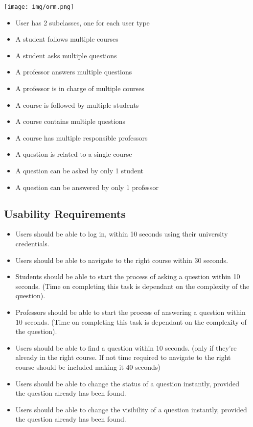 \documentclass[10pt]{report}
\begin{document}
\begin{center}
	\texttt{[image: img/orm.png]}
\end{center}

\begin{itemize}
\item User has 2 subclasses, one for each user type
\item A student follows multiple courses
\item A student asks multiple questions
\item A professor answers multiple questions
\item A professor is in charge of multiple courses
\item A course is followed by multiple students
\item A course contains multiple questions
\item A course has multiple responsible professors
\item A question is related to a single course
\item A question can be asked by only 1 student
\item A question can be answered by only 1 professor

\end{itemize}

\subsection{Usability Requirements}
\begin{itemize}
	\item Users should be able to log in, within 10 seconds using their university credentials.
	\item Users should be able to navigate to the right course within 30 seconds.
	\item Students should be able to start the process of asking a question within 10 seconds. (Time on completing this task is dependant on the complexity of the question).
	\item Professors should be able to start the process of answering a question within 10 seconds. (Time on completing this task is dependant on the complexity of the question).
	\item Users should be able to find a question within 10 seconds. (only if they're already in the right course. If not time required to navigate to the right course should be included making it 40 seconds)
	\item Users should be able to change the status of a question instantly, provided the question already has been found.
	\item Users should be able to change the visibility of a question instantly, provided the question already has been found.
\end{itemize}
\end{document}
